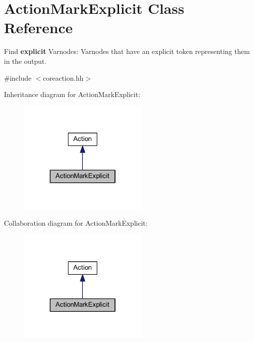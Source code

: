 \hypertarget{class_action_mark_explicit}{}\section{Action\+Mark\+Explicit Class Reference}
\label{class_action_mark_explicit}


Find {\bfseries{explicit}} Varnodes\+: Varnodes that have an explicit token representing them in the output.  




{\ttfamily \#include $<$coreaction.\+hh$>$}



Inheritance diagram for Action\+Mark\+Explicit\+:
\nopagebreak
\begin{figure}[H]
\begin{center}
\leavevmode
\includegraphics[width=178pt]{class_action_mark_explicit__inherit__graph}
\end{center}
\end{figure}


Collaboration diagram for Action\+Mark\+Explicit\+:
\nopagebreak
\begin{figure}[H]
\begin{center}
\leavevmode
\includegraphics[width=178pt]{class_action_mark_explicit__coll__graph}
\end{center}
\end{figure}
